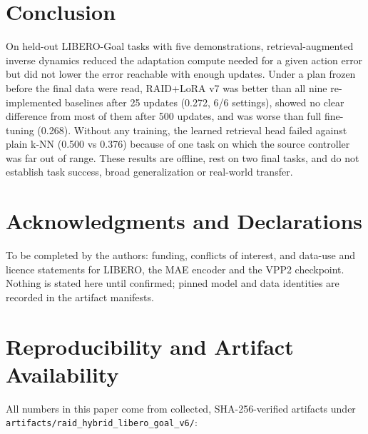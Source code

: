 \documentclass[11pt,a4paper]{article}
\begin{document}
\section{Conclusion}

On held-out LIBERO-Goal tasks with five demonstrations, retrieval-augmented inverse dynamics reduced the adaptation compute needed for a given action error but did not lower the error reachable with enough updates. Under a plan frozen before the final data were read, RAID+LoRA v7 was better than all nine re-implemented baselines after 25 updates (0.272, 6/6 settings), showed no clear difference from most of them after 500 updates, and was worse than full fine-tuning (0.268). Without any training, the learned retrieval head failed against plain k-NN (0.500 vs 0.376) because of one task on which the source controller was far out of range. These results are offline, rest on two final tasks, and do not establish task success, broad generalization or real-world transfer.

\section*{Acknowledgments and Declarations}

To be completed by the authors: funding, conflicts of interest, and data-use and licence statements for LIBERO, the MAE encoder and the VPP2 checkpoint. Nothing is stated here until confirmed; pinned model and data identities are recorded in the artifact manifests.

\section*{Reproducibility and Artifact Availability}

All numbers in this paper come from collected, SHA-256-verified artifacts under \texttt{artifacts/raid\_hybrid\_libero\_goal\_v6/}:
\end{document}
